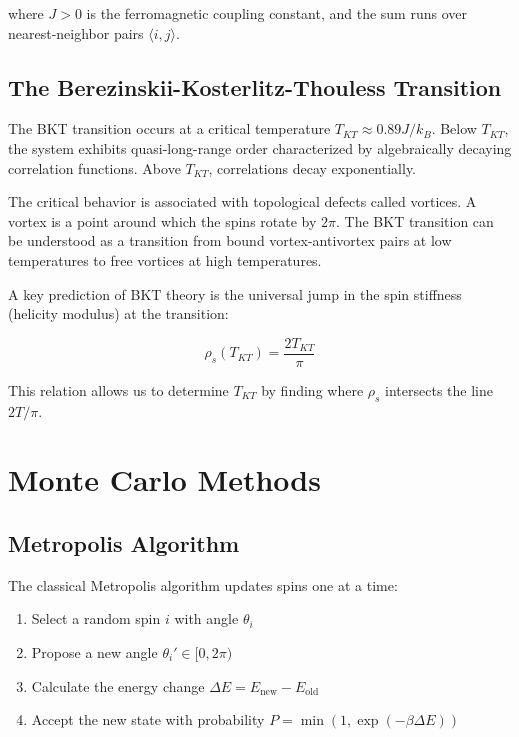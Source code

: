 \documentclass[12pt,a4paper]{article}
\begin{document}
where $J > 0$ is the ferromagnetic coupling constant, and the sum runs over nearest-neighbor pairs $\langle i,j \rangle$. 

\subsection{The Berezinskii-Kosterlitz-Thouless Transition}

The BKT transition occurs at a critical temperature $T_{KT} \approx 0.89 J/k_B$. Below $T_{KT}$, the system exhibits quasi-long-range order characterized by algebraically decaying correlation functions. Above $T_{KT}$, correlations decay exponentially.

The critical behavior is associated with topological defects called vortices. A vortex is a point around which the spins rotate by $2\pi$. The BKT transition can be understood as a transition from bound vortex-antivortex pairs at low temperatures to free vortices at high temperatures.

A key prediction of BKT theory is the universal jump in the spin stiffness (helicity modulus) at the transition:

\begin{equation}
\rho_s(T_{KT}) = \frac{2T_{KT}}{\pi}
\end{equation}

This relation allows us to determine $T_{KT}$ by finding where $\rho_s$ intersects the line $2T/\pi$.

\section{Monte Carlo Methods}

\subsection{Metropolis Algorithm}

The classical Metropolis algorithm updates spins one at a time:
\begin{enumerate}
    \item Select a random spin $i$ with angle $\theta_i$
    \item Propose a new angle $\theta_i' \in [0, 2\pi)$
    \item Calculate the energy change $\Delta E = E_{\text{new}} - E_{\text{old}}$
    \item Accept the new state with probability $P = \min(1, \exp(-\beta \Delta E))$
\end{enumerate}
\end{document}

